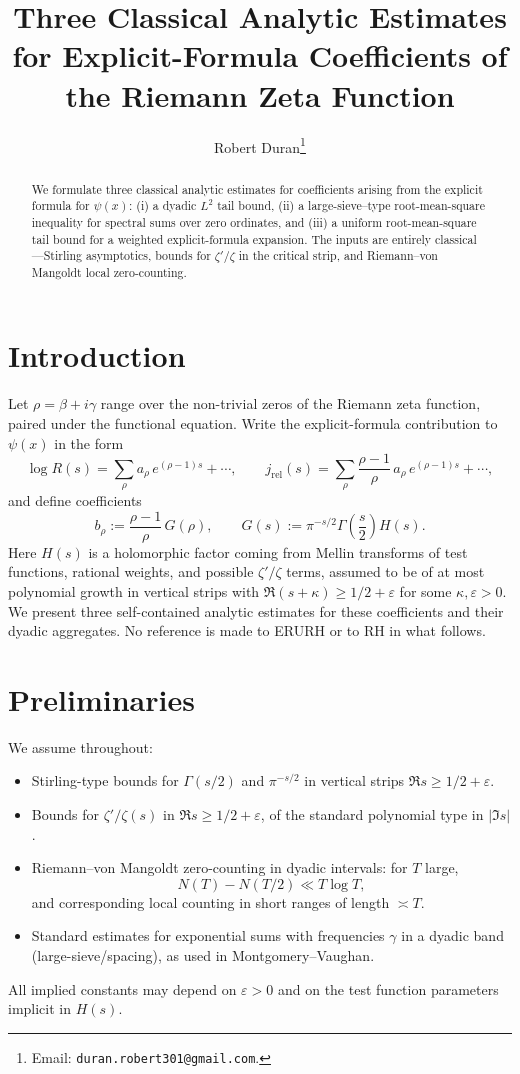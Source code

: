 \documentclass[11pt]{article}
\title{Three Classical Analytic Estimates for Explicit-Formula Coefficients of the Riemann Zeta Function}
\author{Robert Duran\thanks{Email: \texttt{duran.robert301@gmail.com}.}}
\date{}
\theoremstyle{plain}
\theoremstyle{definition}
\begin{document}
\maketitle

\begin{abstract}
We formulate three classical analytic estimates for coefficients arising from the explicit formula for $\psi(x)$: (i) a dyadic $L^2$ tail bound, (ii) a large-sieve--type root-mean-square inequality for spectral sums over zero ordinates, and (iii) a uniform root-mean-square tail bound for a weighted explicit-formula expansion. The inputs are entirely classical---Stirling asymptotics, bounds for $\zeta'/\zeta$ in the critical strip, and Riemann--von Mangoldt local zero-counting.
\end{abstract}

\section{Introduction}
Let $\rho = \beta + i\gamma$ range over the non-trivial zeros of the Riemann zeta function, paired under the functional equation. Write the explicit-formula contribution to $\psi(x)$ in the form
\[
  \log R(s) = \sum_{\rho} a_\rho\, e^{(\rho-1)s} + \cdots, \qquad
  j_{\mathrm{rel}}(s) = \sum_{\rho} \frac{\rho-1}{\rho}\, a_\rho\, e^{(\rho-1)s} + \cdots,
\]
and define coefficients
\[
  b_\rho := \frac{\rho-1}{\rho}\, G(\rho), \qquad
  G(s) := \pi^{-s/2} \Gamma\!\left(\frac{s}{2}\right) H(s).
\]
Here $H(s)$ is a holomorphic factor coming from Mellin transforms of test functions, rational weights, and possible $\zeta'/\zeta$ terms, assumed to be of at most polynomial growth in vertical strips with $\Re(s+\kappa)\ge 1/2+\varepsilon$ for some $\kappa,\varepsilon>0$. We present three self-contained analytic estimates for these coefficients and their dyadic aggregates. No reference is made to ERURH or to RH in what follows.

\section{Preliminaries}
We assume throughout:
\begin{itemize}
  \item Stirling-type bounds for $\Gamma(s/2)$ and $\pi^{-s/2}$ in vertical strips $\Re s \ge 1/2+\varepsilon$.
  \item Bounds for $\zeta'/\zeta(s)$ in $\Re s \ge 1/2+\varepsilon$, of the standard polynomial type in $|\Im s|$.
  \item Riemann--von Mangoldt zero-counting in dyadic intervals: for $T$ large,
  \[
    N(T) - N(T/2) \ll T \log T,
  \]
  and corresponding local counting in short ranges of length $\asymp T$.
  \item Standard estimates for exponential sums with frequencies $\gamma$ in a dyadic band (large-sieve/spacing), as used in Montgomery--Vaughan.
\end{itemize}
All implied constants may depend on $\varepsilon>0$ and on the test function parameters implicit in $H(s)$.
\end{document}
